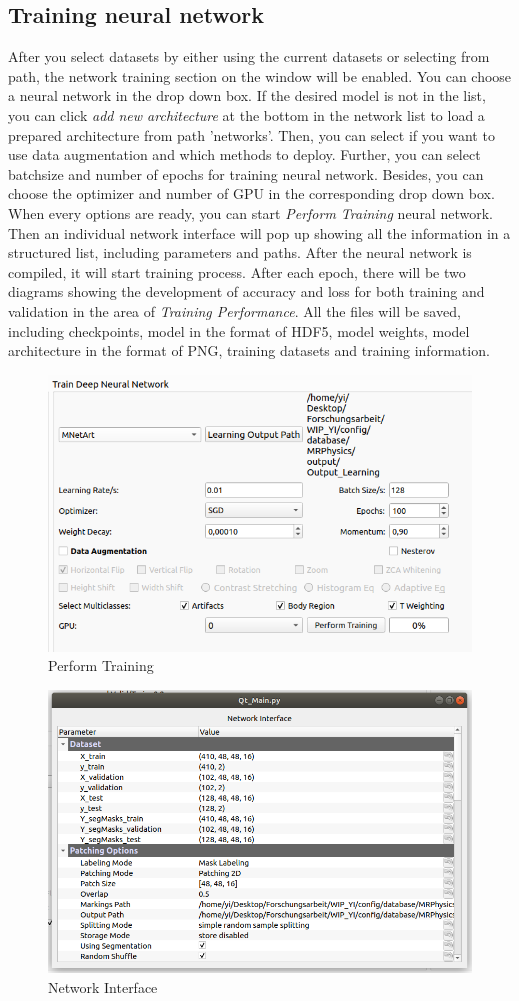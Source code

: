 \documentclass[12pt]{article}
\begin{document}
\subsection{Training neural network}
After you select datasets by either using the current datasets or selecting from path, the network training section on the window will be enabled. You can choose a neural network in the drop down box. If the desired model is not in the list, you can click \textit{add new architecture} at the bottom in the network list to load a prepared architecture from path 'networks'. Then, you can select if you want to use data augmentation and which methods to deploy. Further, you can select batchsize and number of epochs for training neural network. Besides, you can choose the optimizer and number of GPU in the corresponding drop down box. When every options are ready, you can start \textit{Perform Training} neural network. Then an individual network interface will pop up showing all the information in a structured list, including parameters and paths. After the neural network is compiled, it will start training process. After each epoch, there will be two diagrams showing the development of accuracy and loss for both training and validation in the area of \textit{Training Performance}. All the files will be saved, including checkpoints, model in the format of HDF5, model weights, model architecture in the format of PNG, training datasets and training information. 
\begin{figure}[htbp]	
	\centering
	\includegraphics[width=\textwidth]{perform_training.png}
	\caption[Perform Training]{Perform Training}
	\label{fig:perform_training}
\end{figure}
\begin{figure}[htbp]	
	\centering
	\includegraphics[width=\textwidth]{network_interface.png}
	\caption[Network Interface]{Network Interface}
	\label{fig:network_interface}
\end{figure}
\end{document}

